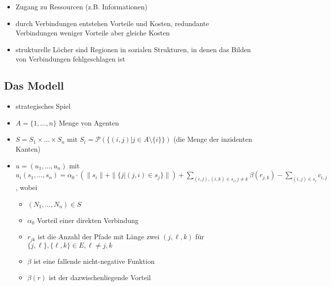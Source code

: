 \begin{itemize}
	\item Zugang zu Ressourcen (z.B. Informationen)
	\item durch Verbindungen entstehen Vorteile und Kosten, redundante Verbindungen weniger Vorteile aber gleiche Kosten
	\item strukturelle Löcher sind Regionen in sozialen Strukturen, in denen das Bilden von Verbindungen fehlgeschlagen ist
\end{itemize}
\subsection{Das Modell}
	\begin{itemize}
		\item strategisches Spiel
		\item $A=\{1,\dots,n\}$ Menge von Agenten
		\item $S=S_1\times\dots\times S_n$ mit $S_i=\mathcal{P}(\{(i,j)| j\in A\setminus\{i\}\})$ (die Menge der inzidenten Kanten)
		\item $u=(u_1,\dots,u_n)$ mit $u_i(s_1,\dots,s_n)=\alpha_0\cdot(\|s_i\|+\|\{j| (j,i)\in s_j\}\|)+\sum\limits_{(i,j),(i,k)\in s_i, j\neq k}\beta(r_{j,k})-\sum\limits_{(i,j)\in s_i}c_{i,j}$, wobei
			\begin{itemize}
				\item $(N_1,\dots,N_n)\in S$
				\item $\alpha_0$ Vorteil einer direkten Verbindung
				\item $r_{jk}$ ist die Anzahl der Pfade mit Länge zwei $(j,\ell,k)$ für $\{j,\ell\},\{\ell,k\}\in E,\ell\neq j,k$
				\item $\beta$ ist eine fallende nicht-negative Funktion
				\item $\beta(r)$ ist der dazwischenliegende Vorteil
			\end{itemize}
	\end{itemize}
